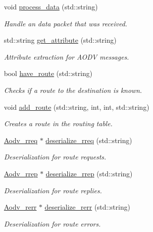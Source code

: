 \begin{DoxyCompactItemize}
void \hyperlink{class_aodv_a5f41daae659881a15d41c6f59cee408f}{process\+\_\+data} (std\+::string)
\begin{DoxyCompactList}\small\item\em Handle an data packet that was received. \end{DoxyCompactList}\item 
std\+::string \hyperlink{class_aodv_ab25f1cbc2e809d2e2593089ed8c6640a}{get\+\_\+attribute} (std\+::string)
\begin{DoxyCompactList}\small\item\em Attribute extraction for A\+O\+DV messages. \end{DoxyCompactList}\item 
bool \hyperlink{class_aodv_a442f2fa875961b7b6b384f75ead0471d}{have\+\_\+route} (std\+::string)
\begin{DoxyCompactList}\small\item\em Checks if a route to the destination is known. \end{DoxyCompactList}\item 
void \hyperlink{class_aodv_a8e0b61eef55966e851754800bcd48641}{add\+\_\+route} (std\+::string, int, int, std\+::string)
\begin{DoxyCompactList}\small\item\em Creates a route in the routing table. \end{DoxyCompactList}\item 
\hyperlink{class_aodv__rreq}{Aodv\+\_\+rreq} $\ast$ \hyperlink{class_aodv_a5dfc0530fb186bade22f71de57397a8c}{deserialize\+\_\+rreq} (std\+::string)
\begin{DoxyCompactList}\small\item\em Deserialization for route requests. \end{DoxyCompactList}\item 
\hyperlink{class_aodv__rrep}{Aodv\+\_\+rrep} $\ast$ \hyperlink{class_aodv_a7e1d8aee908e0c80cf599a4a96ac375e}{deserialize\+\_\+rrep} (std\+::string)
\begin{DoxyCompactList}\small\item\em Deserialization for route replies. \end{DoxyCompactList}\item 
\hyperlink{class_aodv__rerr}{Aodv\+\_\+rerr} $\ast$ \hyperlink{class_aodv_a91b90c40c32c8f2263b557bb22297288}{deserialize\+\_\+rerr} (std\+::string)
\begin{DoxyCompactList}\small\item\em Deserialization for route errors. \end{DoxyCompactList}\item 

\end{DoxyCompactItemize}
